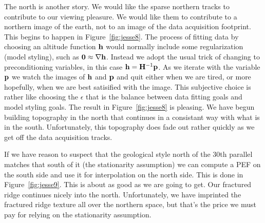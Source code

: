 \par
The north is another story.
We would like the sparse northern tracks
to contribute to our viewing pleasure.
We would like them to contribute to a northern image of the earth,
not to an image of the data acquisition footprint.
This begins to happen in Figure~\ref{fig:jesse8}.
The process of fitting data by choosing an altitude function $\bold h$
would normally include some regularization (model styling),
such as
$\bold 0\approx \nabla \bold h$.
Instead we adopt the usual trick
of changing to preconditioning variables,
in this case $\bold h = \bold H^{-1}\bold p$.
As we iterate with the variable $\bold p$ we watch the images
of $\bold h$ and $\bold p$ and quit either when we are tired,
or more hopefully, when we are best satisified with the image.
This subjective choice is rather like choosing the $\epsilon$
that is the balance between data fitting goals and model styling goals.
The result
in Figure~\ref{fig:jesse8}
is pleasing.
We have begun building topography in the north that continues
in a consistant way with what is in the south.
Unfortunately, this topography does fade out rather quickly
as we get off the data acquisition tracks.




\par
If we have reason to suspect that the geological style north of
the 30th parallel matches that south of it
(the stationarity assumption) we can compute a PEF on the south side
and use it for interpolation on the north side.
This is done in Figure~\ref{fig:jesse9}.
This is about as good as we are going to get.
Our fractured ridge continues nicely into the north.
Unfortunately, we have imprinted the fractured ridge
texture all over the northern space,
but that's the price we must pay for relying on the stationarity assumption.

